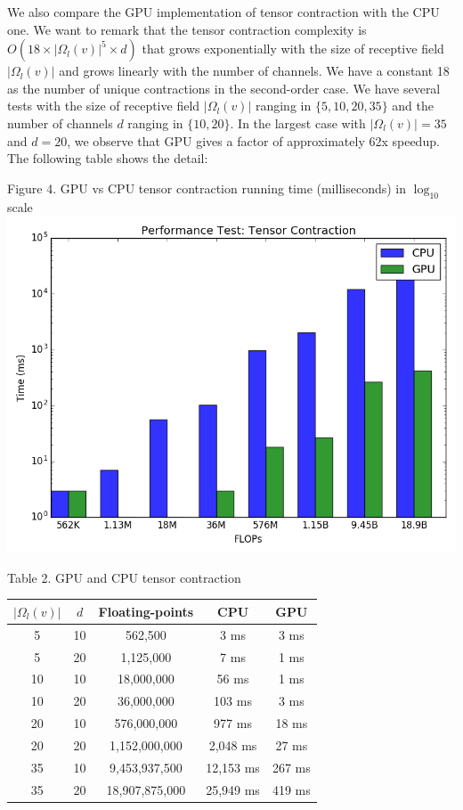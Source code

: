 \documentclass[a4paper]{article}
\begin{document}
We also compare the GPU implementation of tensor contraction with the CPU one. We want to remark that the tensor contraction complexity is $O(18 \times |\Omega_l(v)|^5 \times d)$ that grows exponentially with the size of receptive field $|\Omega_l(v)|$ and grows linearly with the number of channels. We have a constant 18 as the number of unique contractions in the second-order case. We have several tests with the size of receptive field $|\Omega_l(v)|$ ranging in $\{5, 10, 20, 35\}$ and the number of channels $d$ ranging in $\{10, 20\}$. In the largest case with $|\Omega_l(v)| = 35$ and $d = 20$, we observe that GPU gives a factor of approximately 62x speedup. The following table shows the detail:
 
\begin{center}
Figure 4. GPU vs CPU tensor contraction running time (milliseconds) in $\log_{10}$ scale
\includegraphics[scale=0.26]{Tensor_Contraction}
\end{center} 
 
\begin{center}
Table 2. GPU and CPU tensor contraction
\begin{tabular}{|| c | c | c | c | c ||}
	\hline
	$|\Omega_l(v)|$ & $d$ & Floating-points & CPU & GPU \\
	\hline\hline
	5 & 10 & 562,500 & 3 ms & 3 ms \\
	\hline
	5 & 20 & 1,125,000 & 7 ms & 1 ms \\
	\hline
	10 & 10 & 18,000,000 & 56 ms & 1 ms \\
	\hline
	10 & 20 & 36,000,000 & 103 ms & 3 ms \\
	\hline
	20 & 10 & 576,000,000 & 977 ms & 18 ms \\
	\hline 
	20 & 20 & 1,152,000,000 & 2,048 ms & 27 ms \\
	\hline
	35 & 10 & 9,453,937,500 & 12,153 ms & 267 ms \\
	\hline
	35 & 20 & 18,907,875,000 & 25,949 ms & 419 ms \\
	\hline
\end{tabular}
\end{center}
\end{document}
